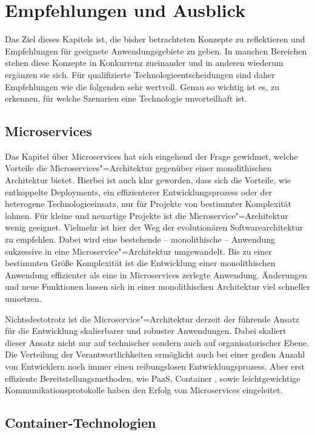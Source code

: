 \chapter{Empfehlungen und Ausblick}

Das Ziel dieses Kapitels ist, die bisher betrachteten Konzepte zu reflektieren und Empfehlungen für geeignete Anwendungsgebiete zu geben. In manchen Bereichen stehen diese Konzepte in Konkurrenz zueinander und in anderen wiederum ergänzen sie sich. Für qualifizierte Technologieentscheidungen sind daher Empfehlungen wie die folgenden sehr wertvoll. Genau so wichtig ist es, zu erkennen, für welche Szenarien eine Technologie unvorteilhaft ist.

\section{Microservices}

Das Kapitel über Microservices hat sich eingehend der Frage gewidmet, welche Vorteile die Microservices"=Architektur gegenüber einer monolithischen Architektur bietet. Hierbei ist auch klar geworden, dass sich die Vorteile, wie entkoppelte Deployments, ein effizienterer Entwicklungsprozess oder der heterogene Technologieeinsatz, nur für Projekte von bestimmter Komplexität lohnen. Für kleine und neuartige Projekte ist die Microservice"=Architektur wenig geeignet. Vielmehr ist hier der Weg der evolutionären Softwarearchitektur zu empfehlen. Dabei wird eine bestehende -- \zB monolithische -- Anwendung sukzessive in eine Microservice"=Architektur umgewandelt. Bis zu einer bestimmten Größe \bzw Komplexität ist die Entwicklung einer monolithischen Anwendung effizienter als eine in Microservices zerlegte Anwendung. Änderungen und neue Funktionen lassen sich in einer monolithischen Architektur viel schneller umsetzen.

Nichtsdestotrotz ist die Microservice"=Architektur derzeit der führende Ansatz für die Entwicklung skalierbarer und robuster Anwendungen. Dabei skaliert dieser Ansatz nicht nur auf technischer sondern auch auf organisatorischer Ebene. Die Verteilung der Verantwortlichkeiten ermöglicht auch bei einer großen Anzahl von Entwicklern noch immer einen reibungslosen Entwicklungsprozess. Aber erst effiziente Bereitstellungsmethoden, wie PaaS, Container \ua, sowie leichtgewichtige Kommunikationsprotokolle haben den Erfolg von Microservices eingeleitet.

\section{Container-Technologien}

